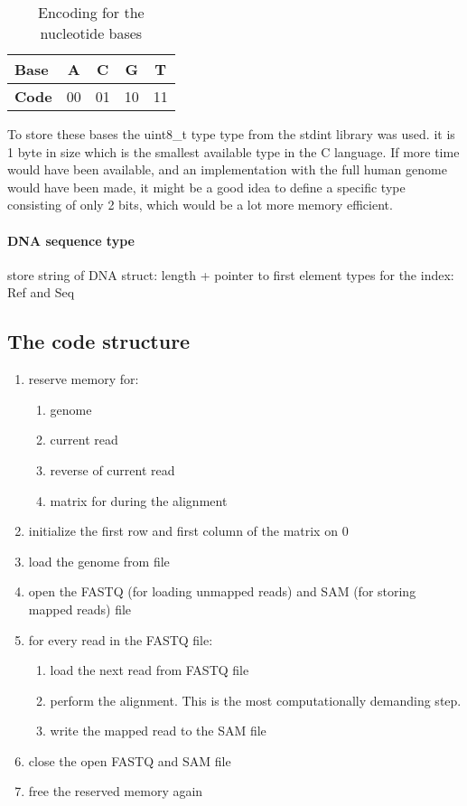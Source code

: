 \begin{table}[H]
	\centering
	\begin{tabular}{|l|c|c|c|c|}
		\hline
		\textbf{Base} & A  & C  & G  & T  \\ \hline
		\textbf{Code} & 00 & 01 & 10 & 11 \\ \hline
	\end{tabular}
	\caption{\centering Encoding for the nucleotide bases}
\end{table}

To store these bases the uint8\_t type type from the stdint library was used. it is 1 byte in size which is the smallest available type in the C language. If more time would have been available, and an implementation with the full human genome would have been made, it might be a good idea to define a specific type consisting of only 2 bits, which would be a lot more memory efficient.

\paragraph{DNA sequence type}

store string of DNA 
struct: length + pointer to first element
types for the index: Ref and Seq

\subsection{The code structure}

\begin{enumerate}
	\item reserve memory for:
	\begin{enumerate}
		\item genome
		\item current read
		\item reverse of current read
		\item matrix for during the alignment
	\end{enumerate}
	\item initialize the first row and first column of the matrix on $0$
	\item load the genome from file
	\item open the FASTQ (for loading unmapped reads) and SAM (for storing mapped reads) file
	\item for every read in the FASTQ file:
	\begin{enumerate}
		\item load the next read from FASTQ file
		\item perform the alignment. This is the most computationally demanding step.
		\item write the mapped read to the SAM file
	\end{enumerate}
	\item close the open FASTQ and SAM file
	\item free the reserved memory again
\end{enumerate}

